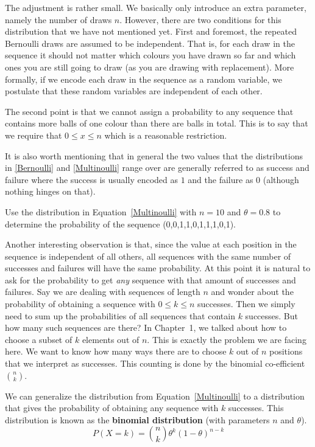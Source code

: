 \documentclass[a4paper,11pt,leqno]{report}
\begin{document}
The adjustment is rather small. We basically only introduce an extra parameter, namely the number of draws $ n $. 
However, there are two conditions for this distribution that we have not mentioned yet. First and foremost,
the repeated Bernoulli draws are assumed to be independent. That is, for each draw in the sequence it should not matter which colours you
have drawn so far and which ones you are still going to draw (as you
are drawing with replacement). More formally, if we encode each draw in the sequence as a random
variable, we postulate that these random variables are independent of each other. 

The second point is that we cannot assign a probability to any sequence that contains more balls of one colour than there are balls in total.
This is to say that we require that $ 0 \leq x \leq n $ which is a reasonable restriction. 

It is also worth mentioning that in general the two values that the distributions in \eqref{Bernoulli} and \eqref{Multinoulli} range
over are generally referred to as success and failure where the success is usually encoded as $ 1 $ and the failure as $ 0 $
(although nothing hinges on that). 

\begin{Exercise}
Use the distribution in Equation~\eqref{Multinoulli} with $ n = 10 $ and $ \theta = 0.8 $ to determine the probability of the sequence (0,0,1,1,0,1,1,1,0,1).
\end{Exercise}

Another interesting observation is that, since the value at each position in the sequence is independent of all others, all sequences with the same
number of successes and failures will have the same probability. At this point it is natural to ask for the probability to get \textit{any}
sequence with that amount of successes and failures. Say we are dealing with sequences of length $ n $ and wonder about the probability of 
obtaining a sequence with $ 0 \leq k \leq n $ successes. Then we simply need to sum up the probabilities of all sequences that contain $ k $ 
successes. But how many such sequences are there? In Chapter~1, we talked about how to choose a subset of $ k $ elements
out of $ n $. This is exactly the problem we are facing here. We want to know how many ways there are to choose $ k $ out of $ n $ positions
that we interpret as successes. This counting is done by the binomial co-efficient $ \binom{n}{k} $.

We can generalize the distribution from Equation~\eqref{Multinoulli} to a distribution that gives the probability of obtaining any sequence
with $ k $ successes. This distribution is known as the \textbf{binomial distribution} (with parameters $ n $ and $ \theta $).
\begin{equation}
P(X=k) = \binom{n}{k} \theta^{k} (1-\theta)^{n-k}
\end{equation}
\end{document}
